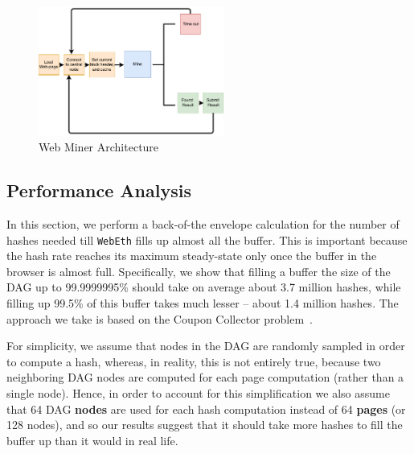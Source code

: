 \documentclass[runningheads]{llncs}
\begin{document}
\begin{figure}[h]
\centering
\includegraphics[width=230px,keepaspectratio]{Hybrid-Miner.pdf}
\caption{Web Miner Architecture}
\label{fig:hybridArchitecture}
\end{figure}

\subsection{Performance Analysis}
In this section, we perform a back-of-the envelope calculation for the number of hashes needed till \verb|WebEth| fills up almost all the buffer. This is important because the hash rate reaches its maximum steady-state only once the buffer in the browser is almost full. Specifically, we show that filling a buffer the size of the DAG up to 99.9999995\% should take on average about 3.7 million hashes, while filling up 99.5\% of this buffer takes much lesser -- about 1.4 million hashes. 
The approach we take is based on the Coupon Collector problem~\cite{couponCollector}. 

For simplicity, we assume that nodes in the DAG are randomly sampled in order to compute a hash, whereas, in reality, this is not entirely true, because two neighboring DAG nodes are computed for each page computation (rather than a single node). Hence, in order to account for this simplification we also assume that 64 DAG \textbf{nodes} are used for each hash computation instead of 64 \textbf{pages} (or 128 nodes), and so our results suggest that it should take more hashes to fill the buffer up than it would in real life.

\end{document}
